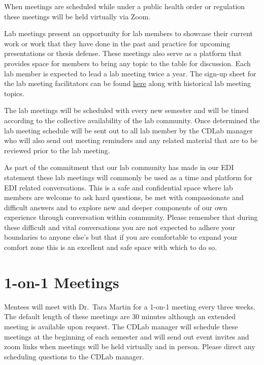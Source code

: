 \documentclass[
]{book}
\begin{document}
When meetings are scheduled while under a public health order or regulation these meetings will be held virtually via Zoom.

Lab meetings present an opportunity for lab members to showcase their current work or work that they have done in the past and practice for upcoming presentations or thesis defense. These meetings also serve as a platform that provides space for members to bring any topic to the table for discussion. Each lab member is expected to lead a lab meeting twice a year. The sign-up sheet for the lab meeting facilitators can be found \href{https://docs.google.com/spreadsheets/d/1WAL131F2qjLT-kYOPUGV7lpESvUIczRtx1Q2oqTfdRQ/edit\#gid=740242269}{here} along with historical lab meeting topics.

The lab meetings will be scheduled with every new semester and will be timed according to the collective availability of the lab community. Once determined the lab meeting schedule will be sent out to all lab member by the CDLab manager who will also send out meeting reminders and any related material that are to be reviewed prior to the lab meeting.

As part of the commitment that our lab community has made in our EDI statement these lab meetings will commonly be used as a time and platform for EDI related conversations. This is a safe and confidential space where lab members are welcome to ask hard questions, be met with compassionate and difficult answers and to explore new and deeper components of our own experience through conversation within community. Please remember that during these difficult and vital conversations you are not expected to adhere your boundaries to anyone else's but that if you are comfortable to expand your comfort zone this is an excellent and safe space with which to do so.

\hypertarget{on-1-meetings}{%
\section{1-on-1 Meetings}\label{on-1-meetings}}

Mentees will meet with Dr.~Tara Martin for a 1-on-1 meeting every three weeks. The default length of these meetings are 30 minutes although an extended meeting is available upon request. The CDLab manager will schedule these meetings at the beginning of each semester and will send out event invites and zoom links when meetings will be held virtually and in person. Please direct any scheduling questions to the CDLab manager.
\end{document}

